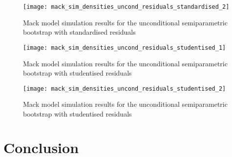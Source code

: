 \documentclass[a4paper]{book}
\begin{document}
\begin{landscape}
  \begin{figure}
    \ContinuedFloat
    \captionsetup{list=off,format=cont}
    \centering
    \texttt{[image: mack\_sim\_densities\_uncond\_residuals\_standardised\_2]}
    \caption{Mack model simulation results for the unconditional semiparametric bootstrap with standardised residuals}
    \label{fig:sim-res}
  \end{figure}
\end{landscape}

\begin{landscape}
  \begin{figure}
    \centering
    \texttt{[image: mack\_sim\_densities\_uncond\_residuals\_studentised\_1]}
    \caption{Mack model simulation results for the unconditional semiparametric bootstrap with studentised residuals}
    \label{fig:sim-res}
  \end{figure}
\end{landscape}

\begin{landscape}
  \begin{figure}
    \ContinuedFloat
    \captionsetup{list=off,format=cont}
    \centering
    \texttt{[image: mack\_sim\_densities\_uncond\_residuals\_studentised\_2]}
    \caption{Mack model simulation results for the unconditional semiparametric bootstrap with studentised residuals}
    \label{fig:sim-res}
  \end{figure}
\end{landscape}

\restoregeometry

\backmatter%

\chapter{Conclusion} \label{conclusion}

\printbibliography%
\end{document}
